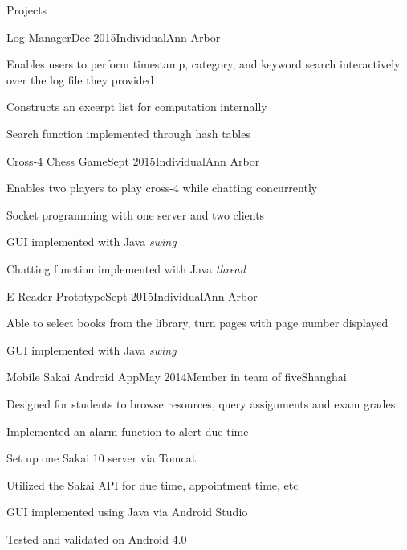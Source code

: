 \documentclass{resume} %
\begin{document}
\begin{rSection}{Projects}

	\begin{rSubsection}{Log Manager}{Dec 2015}{Individual}{Ann Arbor}
		\item Enables users to perform timestamp, category, and keyword search interactively  over the log file they provided
		\item Constructs an excerpt list for computation internally 
		\item Search function implemented through hash tables
	\end{rSubsection}	
	\begin{rSubsection}{Cross-4 Chess Game}{Sept 2015}{Individual}{Ann Arbor}
		\item Enables two players to play cross-4 while chatting concurrently
		\item Socket programming with one server and two clients
		\item GUI implemented with Java \textit{swing}
		\item Chatting function implemented with Java \textit{thread}		
	\end{rSubsection}
	
	\begin{rSubsection}{E-Reader Prototype}{Sept 2015}{Individual}{Ann Arbor}
		\item Able to select books from the library, turn pages with page number displayed
		\item GUI implemented with Java \textit{swing}
	\end{rSubsection}
	
	\begin{rSubsection}{Mobile Sakai Android App}{May 2014}{Member in team of five}{Shanghai}
	\item Designed for students to browse resources, query assignments and exam grades
	\item Implemented an alarm function to alert due time
	\item Set up one Sakai 10 server via Tomcat
	\item Utilized the Sakai API for due time, appointment time, etc
	\item GUI implemented using Java via Android Studio
	\item Tested and validated on Android 4.0
	\end{rSubsection}

\end{rSection}
\end{document}
